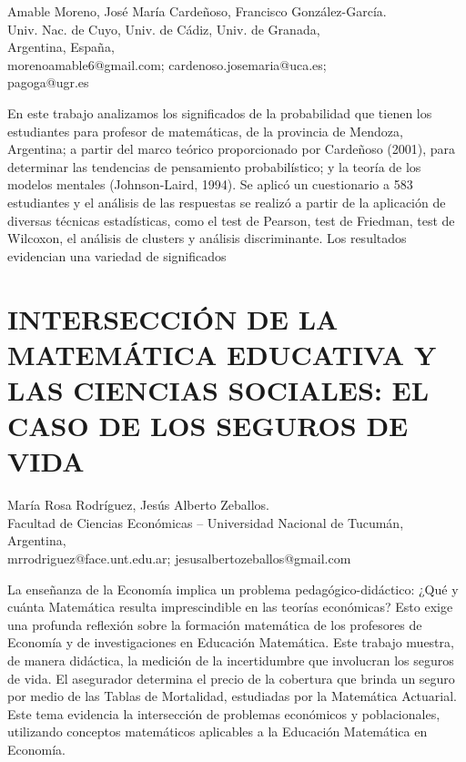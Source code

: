 \begin{datos}
Amable Moreno, José María Cardeñoso,  Francisco González-García.\\
Univ. Nac. de Cuyo, Univ. de Cádiz, Univ. de Granada,\\
\hfill Argentina, España,\\
\hfill morenoamable6@gmail.com; cardenoso.josemaria@uca.es; \\\hfill pagoga@ugr.es
\end{datos} 

En este trabajo analizamos los significados de la probabilidad que
tienen los estudiantes para profesor de matemáticas, de la provincia
de Mendoza, Argentina; a partir del marco teórico proporcionado por
Cardeñoso (2001), para determinar las tendencias de pensamiento probabilístico;
y la teoría de los modelos mentales (Johnson-Laird, 1994). Se aplicó
un cuestionario a 583 estudiantes y el análisis de las respuestas
se realizó a partir de la aplicación de diversas técnicas estadísticas,
como el test de Pearson, test de Friedman, test de Wilcoxon, el análisis
de clusters y análisis discriminante. Los resultados evidencian una
variedad de significados 


\section{INTERSECCIÓN DE LA MATEMÁTICA EDUCATIVA Y LAS CIENCIAS SOCIALES:
EL CASO DE LOS SEGUROS DE VIDA }

\begin{datos}
María Rosa Rodr\'iguez,   Jesús Alberto Zeballos.\\
Facultad de Ciencias Económicas – Universidad Nacional de Tucumán,\\
\hfill Argentina, \\
\hfill mrrodriguez@face.unt.edu.ar; jesusalbertozeballos@gmail.com 
\end{datos}

La enseñanza de la Economía implica un problema pedagógico-didáctico:
¿Qué y cuánta Matemática resulta imprescindible en las teorías económicas?
Esto exige una profunda reflexión sobre la formación matemática de
los profesores de Economía y de investigaciones en Educación Matemática.
Este trabajo muestra, de manera didáctica, la medición de la incertidumbre
que involucran los seguros de vida. El asegurador determina el precio
de la cobertura que brinda un seguro por medio de las Tablas de Mortalidad,
estudiadas por la Matemática Actuarial. Este tema evidencia la intersección
de problemas económicos y poblacionales, utilizando conceptos matemáticos
aplicables a la Educación Matemática en Economía.


